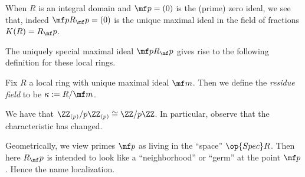 \begin{example}
	When $R$ is an integral domain and $\mf p=(0)$ is the (prime) zero ideal, we see that, indeed $\mf pR_\mf p=(0)$ is the unique maximal ideal in the field of fractions $K(R)=R_\mf p$.
\end{example}
The uniquely special maximal ideal $\mf pR_\mf p$ gives rise to the following definition for these local rings.
\begin{definition}
	Fix $R$ a local ring with unique maximal ideal $\mf m$. Then we define the \textit{residue field} to be $\kappa:=R/\mf m$.
\end{definition}
\begin{example}
	We have that $\ZZ_{(p)}/p\ZZ_{(p)}\cong\ZZ/p\ZZ$. In particular, observe that the characteristic has changed.
\end{example}
\begin{remark}
	Geometrically, we view primes $\mf p$ as living in the ``space'' $\op{Spec}R$. Then here $R_\mf p$ is intended to look like a ``neighborhood'' or ``germ'' at the point $\mf p$. Hence the name localization.
\end{remark}

